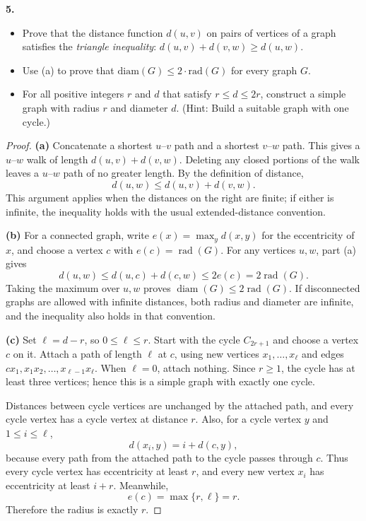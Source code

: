 \documentclass[12pt]{amsart}
\theoremstyle{conjecture}
\theoremstyle{definition}
\theoremstyle{question}
\theoremstyle{theorem}
\begin{document}
    \noindent\textbf{5.}
    \begin{itemize}
        \item[(a)] Prove that the distance function $d(u,v)$ on pairs of vertices of a graph satisfies
        the \emph{triangle inequality}: $d(u,v) + d(v,w) \ge d(u,w)$.
        \item[(b)] Use (a) to prove that $\text{diam}(G) \le 2 \cdot \text{rad}(G)$ for every graph $G$.
        \item[(c)] For all positive integers $r$ and $d$ that satisfy $r\le d \le 2r$, construct a simple
        graph with radius $r$ and diameter $d$.
        (Hint: Build a suitable graph with one cycle.)
    \end{itemize}

    \begin{proof}
        \textbf{(a)} Concatenate a shortest $u$--$v$ path and a shortest
        $v$--$w$ path.  This gives a $u$--$w$ walk of length
        $d(u,v)+d(v,w)$.  Deleting any closed portions of the walk leaves
        a $u$--$w$ path of no greater length.  By the definition of distance,
        \[
            d(u,w)\le d(u,v)+d(v,w).
        \]
        This argument applies when the distances on the right are finite;
        if either is infinite, the inequality holds with the usual
        extended-distance convention.

        \medskip
        \noindent\textbf{(b)} For a connected graph, write
        $e(x)=\max_y d(x,y)$ for the eccentricity of $x$, and choose a
        vertex $c$ with $e(c)=\operatorname{rad}(G)$.  For any vertices
        $u,w$, part (a) gives
        \[
            d(u,w)\le d(u,c)+d(c,w)
            \le2e(c)=2\operatorname{rad}(G).
        \]
        Taking the maximum over $u,w$ proves
        $\operatorname{diam}(G)\le2\operatorname{rad}(G)$.
        If disconnected graphs are allowed with infinite distances,
        both radius and diameter are infinite, and the inequality also
        holds in that convention.

        \medskip
        \noindent\textbf{(c)} Set $\ell=d-r$, so $0\le\ell\le r$.
        Start with the cycle $C_{2r+1}$ and choose a vertex $c$ on it.
        Attach a path of length $\ell$ at $c$, using new vertices
        $x_1,\ldots,x_\ell$ and edges $cx_1,x_1x_2,\ldots,
        x_{\ell-1}x_\ell$.  When $\ell=0$, attach nothing.
        Since $r\ge1$, the cycle has at least three vertices; hence this
        is a simple graph with exactly one cycle.

        Distances between cycle vertices are unchanged by the attached
        path, and every cycle vertex has a cycle vertex at distance $r$.
        Also, for a cycle vertex $y$ and $1\le i\le\ell$,
        \[
            d(x_i,y)=i+d(c,y),
        \]
        because every path from the attached path to the cycle passes
        through $c$.  Thus every cycle vertex has eccentricity at least
        $r$, and every new vertex $x_i$ has eccentricity at least $i+r$.
        Meanwhile,
        \[
            e(c)=\max\{r,\ell\}=r.
        \]
        Therefore the radius is exactly $r$.


\end{proof}
\end{document}
